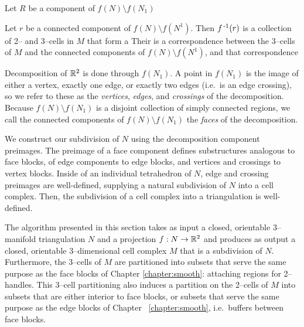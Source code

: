 Let $R$ be a component of $f(N)\setminus f(N_1)$


\newpage

Let $r$ be a connected component of $f(N)\setminus f(N^1)$.
Then $f^{\,\text{-}1}(r)$ is a collection of 2-- and 3--cells in $M$ that form a  
Their is a correspondence between the 3--cells of $M$ and the connected components of $f(N)\setminus f(N^1)$, and that correspondence 

Decomposition of $\mathbb{R}^2$ is done through $f(N_1)$.
A point in $f(N_1)$ is the image of either a vertex, exactly one edge, or exactly two edges (i.e.\ is an edge crossing), so we refer to these as the \emph{vertices}, \emph{edges}, and \emph{crossings} of the decomposition.
Because $f(N)\setminus f(N_1)$  is a disjoint collection of simply connected regions, we call the connected components of $f(N)\setminus f(N_1)$ the \emph{faces} of the decomposition.

We construct our subdivision of $N$ using the decomposition component preimages.
The preimage of a face component defines substructures analogous to face blocks, of edge components to edge blocks, and vertices and crossings to vertex blocks.
Inside of an individual tetrahedron of $N$, edge and crossing preimages are well-defined, supplying a natural subdivision of $N$ into a cell complex.
Then, the subdivision of a cell complex into a triangulation is well-defined.

The algorithm presented in this section takes as input a closed, orientable 3--manifold triangulation $N$ and a projection $f:N\to\mathbb{R}^2$ and produces as output a closed, orientable 3--dimensional cell complex $M$ that is a subdivision of $N$.
Furthermore, the 3--cells of $M$ are partitioned into subsets that serve the same purpose as the face blocks of Chapter \ref{chapter:smooth}: attaching regions for 2--handles.
This 3--cell partitioning also induces a partition on the 2--cells of $M$ into subsets that are either interior to face blocks, or subsets that serve the same purpose as the edge blocks of Chapter ~\ref{chapter:smooth}, i.e.\ buffers between face blocks.





